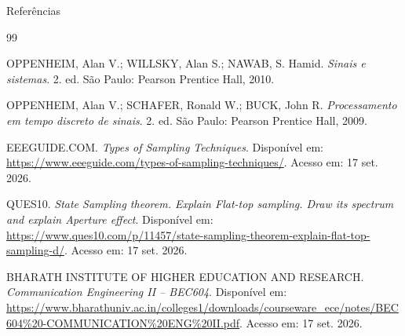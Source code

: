 \documentclass{beamer}
\begin{document}
\begin{frame}{Referências}
    \footnotesize

    \begin{thebibliography}{99}

    OPPENHEIM, Alan V.; WILLSKY, Alan S.; NAWAB, S. Hamid.
    \textit{Sinais e sistemas}.
    2. ed. São Paulo: Pearson Prentice Hall, 2010.

    OPPENHEIM, Alan V.; SCHAFER, Ronald W.; BUCK, John R.
    \textit{Processamento em tempo discreto de sinais}.
    2. ed. São Paulo: Pearson Prentice Hall, 2009.

    EEEGUIDE.COM.
    \textit{Types of Sampling Techniques}.
    Disponível em:
    \url{https://www.eeeguide.com/types-of-sampling-techniques/}.
    Acesso em: 17 set. 2026.

    QUES10.
    \textit{State Sampling theorem. Explain Flat-top sampling.
    Draw its spectrum and explain Aperture effect}.
    Disponível em:
    \url{https://www.ques10.com/p/11457/state-sampling-theorem-explain-flat-top-sampling-d/}.
    Acesso em: 17 set. 2026.

    BHARATH INSTITUTE OF HIGHER EDUCATION AND RESEARCH.
    \textit{Communication Engineering II -- BEC604}.
    Disponível em:
    \url{https://www.bharathuniv.ac.in/colleges1/downloads/courseware_ece/notes/BEC604\%20-COMMUNICATION\%20ENG\%20II.pdf}.
    Acesso em: 17 set. 2026.

    \end{thebibliography}
\end{frame}
\end{document}
